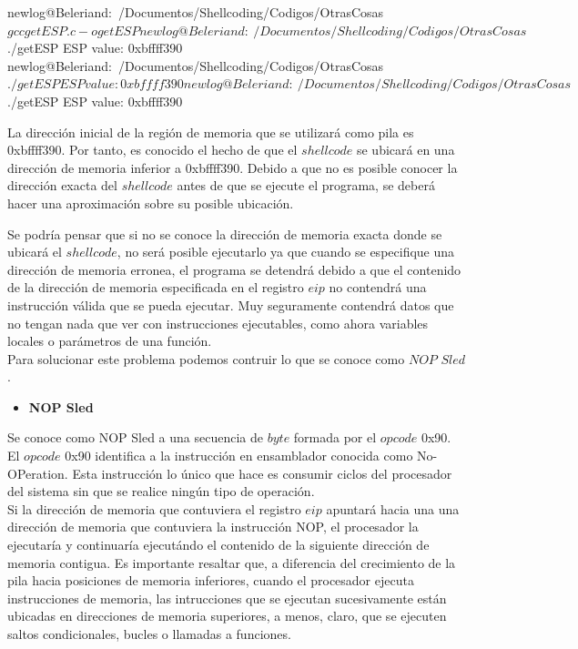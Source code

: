 \documentclass [titlepage, 12pt]{article}
\begin{document}
\begin{listing}[style=consola, numbers=none, caption=Modificaci\'on del registro $eip$]
newlog@Beleriand:~/Documentos/Shellcoding/Codigos/OtrasCosas$ gcc getESP.c -o getESP
newlog@Beleriand:~/Documentos/Shellcoding/Codigos/OtrasCosas$ ./getESP 
ESP value: 0xbffff390
newlog@Beleriand:~/Documentos/Shellcoding/Codigos/OtrasCosas$ ./getESP 
ESP value: 0xbffff390
newlog@Beleriand:~/Documentos/Shellcoding/Codigos/OtrasCosas$ ./getESP 
ESP value: 0xbffff390
\end{listing}

La direcci\'on inicial de la regi\'on de memoria que se utilizar\'a como pila es 0xbffff390. Por tanto, es conocido el hecho de que el $shellcode$ se ubicar\'a en una direcci\'on de memoria inferior a 0xbffff390. Debido a que no es posible conocer la direcci\'on exacta del $shellcode$ antes de que se ejecute el programa, se deber\'a hacer una aproximaci\'on sobre su posible ubicaci\'on. \bigskip

Se podr\'ia pensar que si no se conoce la direcci\'on de memoria exacta donde se ubicar\'a el $shellcode$, no ser\'a posible ejecutarlo ya que cuando se especifique una direcci\'on de memoria erronea, el programa se detendr\'a debido a que el contenido de la direcci\'on de memoria especificada en el registro $eip$ no contendr\'a una instrucci\'on v\'alida que se pueda ejecutar. Muy seguramente contendr\'a datos que no tengan nada que ver con instrucciones ejecutables, como ahora variables locales o par\'ametros de una funci\'on.\\
Para solucionar este problema podemos contruir lo que se conoce como $NOP$ $Sled$. \bigskip

\begin{itemize}
	\item \textbf{NOP Sled}
\end{itemize}

Se conoce como NOP Sled a una secuencia de $byte$ formada por el $opcode$ 0x90. El $opcode$ 0x90 identifica a la instrucci\'on en ensamblador conocida como No-OPeration. Esta instrucci\'on lo \'unico que hace es consumir ciclos del procesador del sistema sin que se realice ning\'un tipo de operaci\'on.\\
Si la direcci\'on de memoria que contuviera el registro $eip$ apuntar\'a hacia una una direcci\'on de memoria que contuviera la instrucci\'on NOP, el procesador la ejecutar\'ia y continuar\'ia ejecut\'ando el contenido de la siguiente direcci\'on de memoria contigua. Es importante resaltar que, a diferencia del crecimiento de la pila hacia posiciones de memoria inferiores, cuando el procesador ejecuta instrucciones de memoria, las intrucciones que se ejecutan sucesivamente est\'an ubicadas en direcciones de memoria superiores, a menos, claro, que se ejecuten saltos condicionales, bucles o llamadas a funciones.\bigskip
\end{document}

